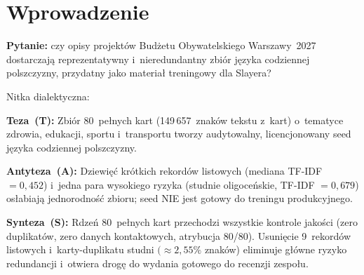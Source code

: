 
\begin{abstract}
\noindent
Budujemy seed datasetu języka współczesnej polszczyzny z opisów projektów
Budżetu Obywatelskiego Warszawy~2027 (licencja CC~BY-SA~4.0).
Aktualny stan: 89~rekordów, 152\,526~znaków, 9~kategorii, 16~dzielnic;
80~pełnych kart ze stabilnym \texttt{source\_url} i~kompletną atrybucją.
Analiza redundancji wykazała medianę podobieństwa TF-IDF $= 0{,}034$
w~rdzeniu pełnych kart --- poziom niski, porównywalny z~niezależnymi
dokumentami. Seed spełnia kryteria recenzji v0.1, lecz nie jest jeszcze
dojrzałym datassetem produkcyjnym.
\end{abstract}

\section{Wprowadzenie}

\textbf{Pytanie:} czy opisy projektów Budżetu Obywatelskiego Warszawy~2027
dostarczają reprezentatywny i~nieredundantny zbiór języka codziennej
polszczyzny, przydatny jako materiał treningowy dla Slayera?

\smallskip
\noindent
Nitka dialektyczna:

\medskip
\noindent
\textbf{Teza~(T):} Zbiór 80~pełnych kart (149\,657~znaków tekstu z~kart)
o~tematyce zdrowia, edukacji, sportu i~transportu tworzy audytowalny,
licencjonowany seed języka codziennej polszczyzny.

\medskip
\noindent
\textbf{Antyteza~(A):} Dziewięć krótkich rekordów listowych
(mediana TF-IDF $= 0{,}452$) i~jedna para wysokiego ryzyka
(studnie oligoceńskie, TF-IDF $= 0{,}679$) osłabiają jednorodność
zbioru; seed NIE jest gotowy do treningu produkcyjnego.

\begin{slayerinsight}
\textbf{Synteza~(S):} Rdzeń 80~pełnych kart przechodzi wszystkie
kontrole jakości (zero duplikatów, zero danych kontaktowych,
atrybucja 80/80). Usunięcie 9~rekordów listowych i~karty-duplikatu
studni $(\approx 2{,}55\%$ znaków) eliminuje główne ryzyko redundancji
i~otwiera drogę do wydania gotowego do recenzji zespołu.
\end{slayerinsight}

